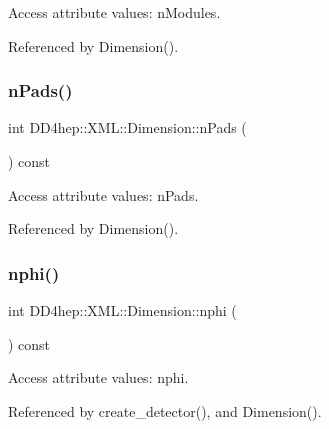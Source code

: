 Access attribute values\+: n\+Modules. 



Referenced by Dimension().

\hypertarget{struct_d_d4hep_1_1_x_m_l_1_1_dimension_a2413f00a297f8d58f6c97d314bc57714}{}\label{struct_d_d4hep_1_1_x_m_l_1_1_dimension_a2413f00a297f8d58f6c97d314bc57714} 
\subsubsection{\texorpdfstring{n\+Pads()}{nPads()}}
{\footnotesize\ttfamily int D\+D4hep\+::\+X\+M\+L\+::\+Dimension\+::n\+Pads (\begin{DoxyParamCaption}{ }\end{DoxyParamCaption}) const}



Access attribute values\+: n\+Pads. 



Referenced by Dimension().

\hypertarget{struct_d_d4hep_1_1_x_m_l_1_1_dimension_a59b746f14ee8916be76fa4af54d16ce9}{}\label{struct_d_d4hep_1_1_x_m_l_1_1_dimension_a59b746f14ee8916be76fa4af54d16ce9} 
\subsubsection{\texorpdfstring{nphi()}{nphi()}}
{\footnotesize\ttfamily int D\+D4hep\+::\+X\+M\+L\+::\+Dimension\+::nphi (\begin{DoxyParamCaption}{ }\end{DoxyParamCaption}) const}



Access attribute values\+: nphi. 



Referenced by create\+\_\+detector(), and Dimension().

\hypertarget{struct_d_d4hep_1_1_x_m_l_1_1_dimension_a05c50e5b309c1690faa51cdc0a5a9a6e}{}\label{struct_d_d4hep_1_1_x_m_l_1_1_dimension_a05c50e5b309c1690faa51cdc0a5a9a6e} 
